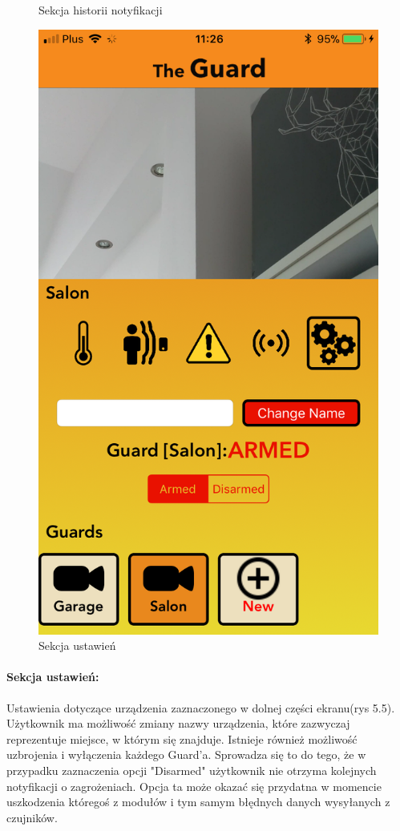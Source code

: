 \begin{figure}[h]
\begin{minipage}{.4\linewidth}
    \caption{Sekcja historii notyfikacji}
    \label{img1}
\end{minipage}
\hspace{.05\linewidth}
\begin{minipage}{.4\linewidth}
    \includegraphics[width=\linewidth]{settings.png}
    \caption{Sekcja ustawień}
    \label{img2}
\end{minipage}
\end{figure} 
\paragraph{Sekcja ustawień:}
Ustawienia dotyczące urządzenia zaznaczonego w dolnej części ekranu(rys 5.5). Użytkownik ma możliwość zmiany nazwy urządzenia, które zazwyczaj reprezentuje miejsce, w którym się znajduje. Istnieje również możliwość uzbrojenia i wyłączenia każdego Guard'a. Sprowadza się to do tego, że w przypadku zaznaczenia opcji "Disarmed" użytkownik nie otrzyma kolejnych notyfikacji o zagrożeniach. Opcja ta może okazać się przydatna w momencie uszkodzenia któregoś z modułów i tym samym błędnych danych wysyłanych z czujników.


